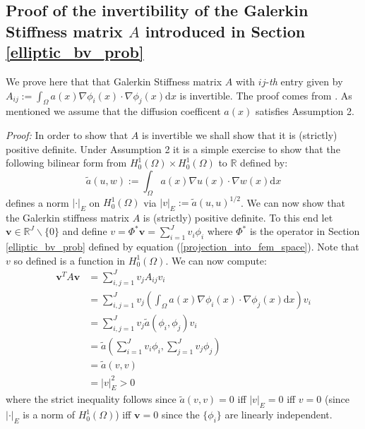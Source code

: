 \subsection{Proof of the invertibility of the Galerkin Stiffness matrix $A$ introduced in Section \textcolor{blue}{\ref{elliptic_bv_prob}}}

We prove here that that Galerkin Stiffness matrix $A$ with $ij$-\textit{th} entry given by $A_{ij}:=\int_{\Omega}a(x)\nabla\phi_{i}(x)\cdot\nabla\phi_{j}(x)\mathrm{d}x$ is invertible. The proof comes from \textcolor{blue}{\citep{lord2014introduction}}. As mentioned we assume that the diffusion coefficent $a(x)$ satisfies Assumption 2.

\noindent \textit{Proof:} In order to show that $A$ is invertible we shall show that it is (strictly) positive definite. Under Assumption 2 it is a simple exercise to show that the following bilinear form from $H_{0}^{1}(\Omega)\times H_{0}^{1}(\Omega)$ to $\mathbb{R}$ defined by:
\begin{equation}
    \tilde{a}(u,w):=\int_{\Omega}a(x)\nabla u(x)\cdot\nabla w(x)\mathrm{d}x
\end{equation}
defines a norm $|\boldsymbol{\cdot}|_{E}$ on $H_{0}^{1}(\Omega)$ via $|v|_{E}:=\tilde{a}(u,u)^{1/2}$. We can now show that the Galerkin stiffness matrix $A$ is (strictly) positive definite. To this end let $\mathbf{v}\in\mathbb{R}^{J}\backslash\{0\}$ and define $v=\Phi^{*}\mathbf{v}=\sum_{i=1}^{J}v_{i}\phi_{i}$ where $\Phi^{*}$ is the operator in Section \textcolor{blue}{\ref{elliptic_bv_prob}} defined by equation (\ref{projection_into_fem_space}). Note that $v$ so defined is a function in $H_{0}^{1}(\Omega)$. We can now compute:
\begin{align*}
    \mathbf{v}^{T}A\mathbf{v} &= \sum_{i,j=1}^{J}v_{j}A_{ij}v_{i} \\
    &=\sum_{i,j=1}^{J}v_{j}(\int_{\Omega}a(x)\nabla\phi_{i}(x)\cdot\nabla\phi_{j}(x)\mathrm{d}x)v_{i} \\
    &=\sum_{i,j=1}^{J}v_{j}\tilde{a}(\phi_{i},\phi_{j})v_{i} \\
    &=\tilde{a}\left(\sum_{i=1}^{J}v_{i}\phi_{i},\sum_{j=1}^{J}v_{j}\phi_{j}\right) \\
    &= \tilde{a}(v,v) \\
    &= |v|_{E}^{2}>0
\end{align*}
where the strict inequality follows since $\tilde{a}(v,v)=0$ iff $|v|_{E}=0$ iff $v=0$ (since $|\boldsymbol{\cdot}|_{E}$ is a norm of $H_{0}^{1}(\Omega)$) iff $\mathbf{v}=0$ since the $\{\phi_{i}\}$ are linearly independent. \qedsymbol

